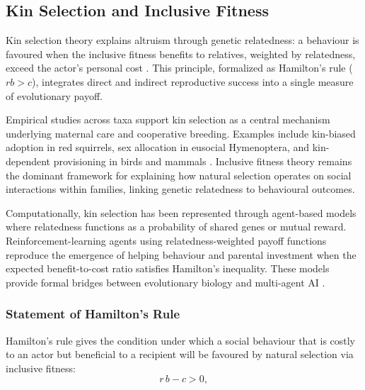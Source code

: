     \subsection{Kin Selection and Inclusive Fitness} %
        
        Kin selection theory explains altruism through genetic relatedness: a behaviour is favoured when the inclusive fitness benefits to relatives, weighted by relatedness, exceed the actor’s personal cost \cite{hamilton1964a, hamilton1964b}.  This principle, formalized as Hamilton’s rule ($r b > c$), integrates direct and indirect reproductive success into a single measure of evolutionary payoff.

        Empirical studies across taxa support kin selection as a central mechanism underlying maternal care and cooperative breeding.  Examples include kin-biased adoption in red squirrels, sex allocation in eusocial Hymenoptera, and kin-dependent provisioning in birds and mammals \cite{gorrell2010, cluttonbrock2002}.  Inclusive fitness theory remains the dominant framework for explaining how natural selection operates on social interactions within families, linking genetic relatedness to behavioural outcomes.
        
        Computationally, kin selection has been represented through agent-based models where relatedness functions as a probability of shared genes or mutual reward.  Reinforcement-learning agents using relatedness-weighted payoff functions reproduce the emergence of helping behaviour and parental investment when the expected benefit-to-cost ratio satisfies Hamilton’s inequality.  These models provide formal bridges between evolutionary biology and multi-agent AI \cite{wang2018}.

        \subsubsection{Statement of Hamilton's Rule}
        Hamilton's rule gives the condition under which a social behaviour that is costly to an actor but beneficial to a recipient will be favoured by natural selection via inclusive fitness:
        \begin{equation}
          r\,b - c > 0,
          \label{eq:hamilton}
        \end{equation}

